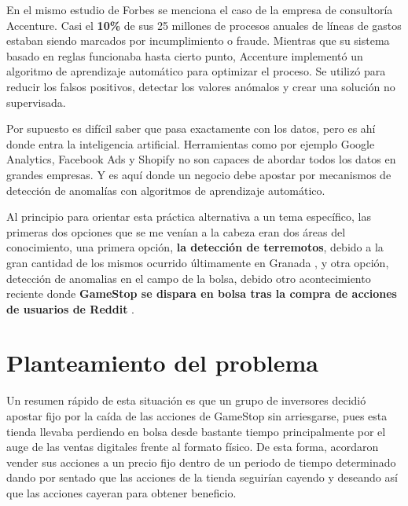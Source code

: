 \documentclass[12pt,twoside]{report}
\begin{document}
En el mismo estudio de Forbes se menciona el caso de la empresa de consultoría Accenture. Casi
el \textbf{10\%} de sus 25 millones de procesos anuales de líneas de gastos estaban siendo marcados por
incumplimiento o fraude. Mientras que su sistema basado en reglas funcionaba hasta cierto punto,
Accenture implementó un algoritmo de aprendizaje automático para optimizar el proceso. Se
utilizó para reducir los falsos positivos, detectar los valores anómalos y crear una solución no
supervisada.

Por supuesto es difícil saber que pasa exactamente con los datos, pero es ahí donde entra la
inteligencia artificial. Herramientas como por ejemplo Google Analytics, Facebook Ads y Shopify no son capaces de
abordar todos los datos en grandes empresas. Y es aquí donde un negocio debe apostar por
mecanismos de detección de anomalías con algoritmos de aprendizaje automático.

Al principio para orientar esta práctica alternativa a un tema específico, las primeras dos opciones que se me venían a la cabeza eran dos áreas del conocimiento, una primera opción, \textbf{la detección de terremotos}, debido a la gran cantidad de los mismos ocurrido últimamente en Granada \cite{terremotos-granada}, y otra opción, detección de anomalias en el campo de la bolsa, debido otro acontecimiento reciente donde \textbf{GameStop se dispara en bolsa tras la compra de acciones de usuarios de Reddit} \cite{reddit-gamestop}.



\section*{Planteamiento del problema}



Un resumen rápido de esta situación es que un grupo de inversores decidió apostar fijo por la caída de las acciones de GameStop sin arriesgarse, pues esta tienda llevaba perdiendo en bolsa desde bastante tiempo principalmente por el auge de las ventas digitales frente al formato físico. De esta forma, acordaron vender sus acciones a un precio fijo dentro de un periodo de tiempo determinado dando por sentado que las acciones de la tienda seguirían cayendo y deseando así que las acciones cayeran para obtener beneficio.
\end{document}
